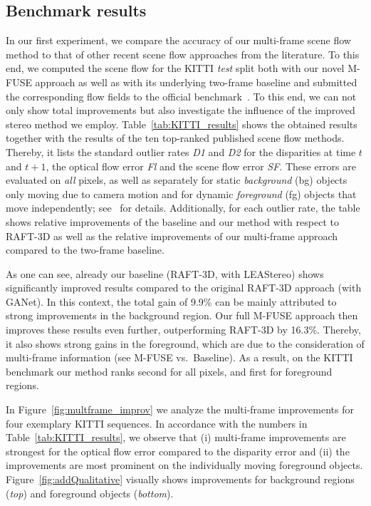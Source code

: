 \documentclass[10pt,twocolumn,letterpaper]{article}
\begin{document}
\subsection{Benchmark results}
In our first experiment, we compare the accuracy of our multi-frame scene flow method to that of other recent scene flow approaches from the literature. 
To this end, we computed the scene flow for the KITTI {\em test} split
both with our novel M-FUSE approach as well as with its underlying two-frame baseline and submitted the corresponding flow fields to the official benchmark~\cite{Menze2015_KITTI}.
To this end, we can not only show total improvements but also investigate the influence of the improved stereo method we employ.
Table~\ref{tab:KITTI_results} shows the obtained results together with the results of the ten top-ranked published scene flow methods.
Thereby, it lists the standard outlier rates 
\emph{D1} and \emph{D2} for the disparities at time $t$ and $t+1$, the optical flow error \emph{Fl} and the scene flow error \emph{SF}.
These errors are evaluated on \emph{all} pixels, as well as separately for static \emph{background} (bg) objects only moving due to camera motion and for dynamic \emph{foreground} (fg) objects that move independently;
see~\cite{Menze2015_KITTI} for details.
Additionally, for each outlier rate, the table shows relative improvements of the baseline and our method with respect to RAFT-3D as well as the relative improvements of our multi-frame approach compared to the two-frame baseline.

As one can see, already our baseline (RAFT-3D, with LEA\-Stereo) shows significantly improved results compared to the original RAFT-3D approach (with GANet).
In this context, the total gain of 9.9\% can be mainly attributed to strong improvements in the background region.
Our full \mbox{M-FUSE} approach then improves these results even further, outperforming RAFT-3D by 16.3\%.
Thereby, it also shows strong gains in the foreground, which are due to the consideration of multi-frame information (see M-FUSE vs.\ Baseline).
As a result, on the KITTI benchmark our method ranks second for all pixels, and first for foreground regions.

In Figure~\ref{fig:multframe_improv} we analyze the multi-frame improvements for four exemplary KITTI sequences.
In accordance with the numbers in Table~\ref{tab:KITTI_results}, we observe that (i) multi-frame improvements are strongest for the optical flow error compared to the disparity error and (ii) the improvements are most prominent on the individually moving foreground objects.
Figure~\ref{fig:addQualitative} visually shows improvements for background regions (\emph{top}) and foreground objects (\emph{bottom}).
\end{document}
